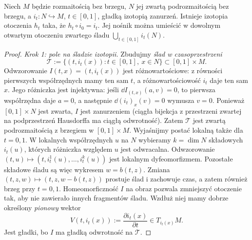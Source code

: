 \begin{twierdzenie}
\label{thm:rozszerzenie-izotopii}
Niech $M$ będzie rozmaitością bez brzegu,
$N$ jej zwartą podrozmaitością bez brzegu,
a $i_t\colon N\hookrightarrow M$, $t\in[0,1]$, gładką
izotopią zanurzeń. Istnieje izotopia otoczenia $h_t$ taka, że
$h_t\circ i_0=i_t$. Jej nośnik można umieścić w dowolnym
otwartym otoczeniu zwartego śladu
$\bigcup_{t\in[0,1]}i_t(N)$.
\end{twierdzenie}
\begin{proof}
\emph{Krok 1: pole na śladzie izotopii.}
Zbudujmy \emph{ślad w czasoprzestrzeni}
\[
 \mathcal T:=\{(t,i_t(x)):t\in[0,1],\ x\in N\}
 \subset[0,1]\times M.
\]
Odwzorowanie $I(t,x)=(t,i_t(x))$ jest różnowartościowe:
z równości pierwszych współrzędnych mamy ten sam $t$,
a różnowartościowość $i_t$ daje ten sam $x$.
Jego różniczka jest injektywna: jeśli
$\dd I_{(t,x)}(a,v)=0$, to pierwsza współrzędna daje
$a=0$, a następnie $\dd (i_t)_x(v)=0$ wymusza $v=0$.
Ponieważ $[0,1]\times N$ jest zwarta, $I$ jest zanurzeniem
(ciągła bijekcja z przestrzeni zwartej na podprzestrzeń
Hausdorffa ma ciągłą odwrotność). Zatem $\mathcal T$
jest zwartą podrozmaitością z brzegiem w $[0,1]\times M$.
Wyjaśnijmy postać lokalną także dla $t=0,1$. W lokalnych
współrzędnych $u$ na $N$ wybieramy $k=\dim N$ składowych $i_t(u)$,
których różniczka względem $u$ jest odwracalna. Odwzorowanie
$(t,u)\mapsto(t,i_t^1(u),\ldots,i_t^k(u))$ jest lokalnym
dyfeomorfizmem. Pozostałe składowe śladu są więc wykresem
$w=b(t,z)$. Zmiana $(t,z,w)\mapsto(t,z,w-b(t,z))$ prostuje
ślad i zachowuje czas, a zatem również brzeg przy $t=0,1$.
Homeomorficzność $I$ na obraz pozwala zmniejszyć otoczenie tak,
aby nie zawierało innych fragmentów śladu.
Wzdłuż niej mamy dobrze określony \emph{pionowy} wektor
\[
 V(t,i_t(x)):=\frac{\partial i_t(x)}{\partial t}
 \in T_{i_t(x)}M.
\]
Jest gładki, bo $I$ ma gładką odwrotność na $\mathcal T$.


\end{proof}
